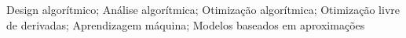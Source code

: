 \noindent Design algorítmico; Análise algorítmica; Otimização algorítmica; Otimização livre de derivadas; Aprendizagem máquina; Modelos baseados em aproximações
